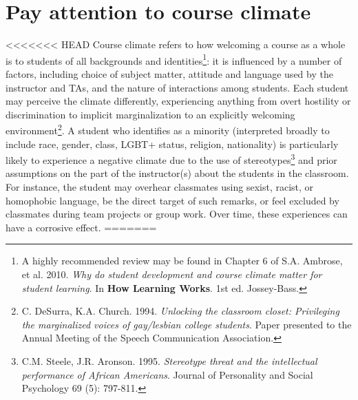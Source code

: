 \section {Pay attention to course climate}
\label{course-climate}
<<<<<<< HEAD
Course climate refers to how welcoming a course as a whole is to students of all backgrounds and identities\footnote{A highly recommended review may be found in Chapter 6 of S.A. Ambrose, et al. 2010. \emph{Why do student development and course climate matter for student learning}. In \textbf{How Learning Works}. 1st ed. Jossey-Bass.}: it is influenced by a number of factors, including choice of subject matter, attitude and language used by the instructor and TAs, and the nature of interactions among students. Each student may perceive the climate differently, experiencing anything from overt hostility or discrimination to implicit marginalization to an explicitly welcoming environment\footnote{C. DeSurra, K.A. Church. 1994. \emph{Unlocking the classroom closet: Privileging the marginalized voices of gay/lesbian college students}. Paper presented to the Annual Meeting of the Speech Communication Association.}. A student who identifies as a minority (interpreted broadly to include race, gender, class, LGBT+ status, religion, nationality) is particularly likely to experience a negative climate due to the use of stereotypes\footnote{C.M. Steele, J.R. Aronson. 1995. \emph{Stereotype threat and the intellectual performance of African Americans}. Journal of Personality and Social Psychology 69 (5): 797-811.} and prior assumptions on the part of the instructor(s) about the students in the classroom. For instance, the student may overhear classmates using sexist, racist, or homophobic language, be the direct target of such remarks, or feel excluded by classmates during team projects or group work. Over time, these experiences can have a corrosive effect.   %
=======
